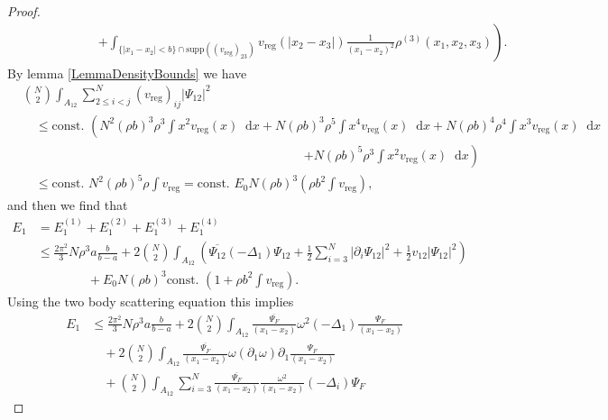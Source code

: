 \documentclass[a4paper,11pt]{article}
\newcommand{\supp}{\text{supp}}
\newcommand{\abs}[1]{\left\lvert #1 \right\rvert}
\newcommand*\diff{\mathop{}\!\mathrm{d}}
\numberwithin{equation}{section}
\begin{document}
\begin{proof}
\begin{equation}
\begin{aligned}
		&\qquad\qquad\qquad\left.+\int_{\{\abs{x_1-x_2}<b\}\cap\supp((v_{\text{reg}})_{23})}v_{\text{reg}}(\abs{x_2-x_3})\frac{1}{(x_1-x_2)^2}\rho^{(3)}(x_1,x_2,x_3)\right).
		\end{aligned}
		\end{equation}
		By lemma \ref{LemmaDensityBounds} we have
		\begin{equation}
		\begin{aligned}
		&\binom{N}{2}\int_{A_{12}} \sum_{2\leq i<j}^{N}(v_{\text{reg}})_{ij}\abs{\Psi_{12}}^2\\&\quad\leq \text{const. } \left(N^2(\rho b)^3\rho^3\int x^2 v_{\text{reg}}(x)\diff x+N(\rho b)^3 \rho^5 \int x^4 v_{\text{reg}}(x)\diff x+N(\rho b)^4\rho^4 \int x^3 v_{\text{reg}}(x)\diff x\right.\\
		&\qquad \qquad \qquad \qquad\hspace{6cm}\left.+N(\rho b)^5 \rho^3 \int x^2 v_{\text{reg}}(x)\diff x\right)\\
		&\quad \leq \text{const. } N^2(\rho b)^5\rho \int v_{\text{reg}}=\text{const. }E_0 N (\rho b)^3 \left(\rho b^2\int v_{\text{reg}}\right),
		\end{aligned}
		\end{equation}
		and then we find that \begin{equation}
		\begin{aligned}
		E_1&=E_1^{(1)}+E_1^{(2)}+E_1^{(3)}+E_1^{(4)}\\&\leq \frac{2\pi^2}{3}N\rho^3 a\frac{b}{b-a}+2\binom{N}{2}\int_{A_{12}}\left(\overline{\Psi_{12}}(-\Delta_1)\Psi_{12}+\frac{1}{2}\sum_{i=3}^{N}\abs{\partial_i\Psi_{12}}^2+\frac{1}{2}v_{12}\abs{\Psi_{12}}^2\right)\\&\qquad \qquad +E_0N(\rho b)^3\text{const. }\left(1+\rho b^2 \int v_{\text{reg}}\right).
		\end{aligned}
		\end{equation}
		Using the two body scattering equation this implies \begin{equation}
		\begin{aligned}
		E_1&\leq \frac{2\pi^2}{3}N\rho^3 a\frac{b}{b-a}+2\binom{N}{2}\int_{A_{12}}\frac{\overline{\Psi_F}}{(x_1-x_2)}\omega^2(-\Delta_1)\frac{\Psi_F}{(x_1-x_2)}\\&\quad+2\binom{N}{2}\int_{A_{12}}\frac{\overline{\Psi_F}}{(x_1-x_2)}\omega(\partial_1\omega)\partial_1\frac{\Psi_F}{(x_1-x_2)}\\
		&\quad +\binom{N}{2}\int_{A_{12}}\sum_{i=3}^{N} \frac{\overline{\Psi_F}}{(x_1-x_2)}\frac{\omega^2}{(x_1-x_2)}(-\Delta_i)\Psi_F

\end{aligned}
\end{equation}
\end{proof}
\end{document}
